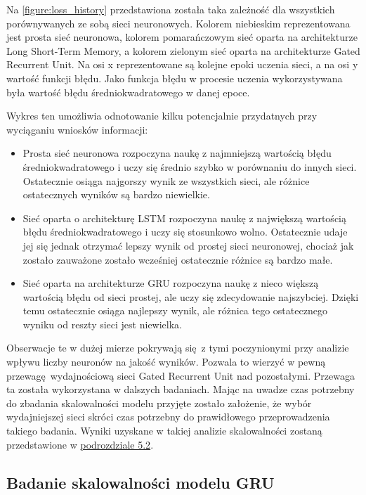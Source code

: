 \documentclass[10pt,a4paper]{article}
\begin{document}
Na \autoref{figure:loss_history} przedstawiona została taka zależność dla wszystkich porównywanych ze sobą sieci neuronowych. Kolorem niebieskim reprezentowana jest prosta sieć neuronowa, kolorem pomarańczowym sieć oparta na architekturze Long Short-Term Memory, a kolorem zielonym sieć oparta na architekturze Gated Recurrent Unit. Na osi x reprezentowane są kolejne epoki uczenia sieci, a na osi y wartość funkcji błędu. Jako funkcja błędu w procesie uczenia wykorzystywana była wartość błędu średniokwadratowego w danej epoce. 

Wykres ten umożliwia odnotowanie kilku potencjalnie przydatnych przy wyciąganiu wniosków informacji:
\begin{itemize}
	\item Prosta sieć neuronowa rozpoczyna naukę z najmniejszą wartością błędu średniokwadratowego i uczy się średnio szybko w porównaniu do innych sieci. Ostatecznie osiąga najgorszy wynik ze wszystkich sieci, ale różnice ostatecznych wyników są bardzo niewielkie.
	\item Sieć oparta o architekturę LSTM rozpoczyna naukę z największą wartością błędu średniokwadratowego i uczy się stosunkowo wolno. Ostatecznie udaje jej się jednak otrzymać lepszy wynik od prostej sieci neuronowej, chociaż jak zostało zauważone zostało wcześniej ostatecznie różnice są bardzo małe.
	\item Sieć oparta na architekturze GRU rozpoczyna naukę z nieco większą wartością błędu od sieci prostej, ale uczy się zdecydowanie najszybciej. Dzięki temu ostatecznie osiąga najlepszy wynik, ale różnica tego ostatecznego wyniku od reszty sieci jest niewielka. 
\end{itemize}

Obserwacje te w dużej mierze pokrywają się z tymi poczynionymi przy analizie wpływu liczby neuronów na jakość wyników. Pozwala to wierzyć w pewną przewagę wydajnościową sieci Gated Recurrent Unit nad pozostałymi. Przewaga ta została wykorzystana w dalszych badaniach. Mając na uwadze czas potrzebny do zbadania skalowalności modelu przyjęte zostało założenie, że wybór wydajniejszej sieci skróci czas potrzebny do prawidłowego przeprowadzenia takiego badania. Wyniki uzyskane w takiej analizie skalowalności zostaną przedstawione w \hyperlink{subsection.5.2}{podrozdziale 5.2}.

\subsection{Badanie skalowalności modelu GRU}
\end{document}
